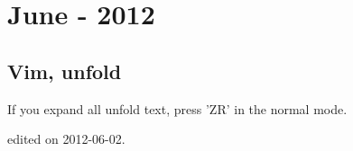 \chapter{June - 2012}
\section{Vim, unfold}
If you expand all unfold text, press 'ZR' in the normal mode.
\par \hfill {\tiny  edited on 2012-06-02.}


